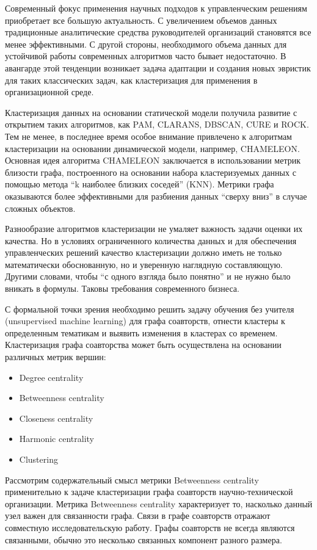 Современный фокус применения научных подходов к управленческим решениям приобретает все большую актуальность. С увеличением объемов данных традиционные аналитические средства руководителей организаций становятся все менее эффективными. С другой стороны, необходимого объема данных для устойчивой работы современных алгоритмов часто бывает недостаточно. В авангарде этой тенденции возникает задача адаптации и создания новых эвристик для таких классических задач, как кластеризация для применения в организационной среде.

Кластеризация данных на основании статической модели получила развитие с открытием таких алгоритмов, как PAM, CLARANS, DBSCAN, CURE и ROCK. Тем не менее, в последнее время особое внимание привлечено к алгоритмам кластеризации на основании динамической модели, например, CHAMELEON. Основная идея алгоритма CHAMELEON заключается в использовании метрик близости графа, построенного на основании набора кластеризуемых данных с помощью метода ``k наиболее близких соседей'' (KNN). Метрики графа оказываются более эффективными для разбиения данных ``сверху вниз'' в случае сложных объектов.

Разнообразие алгоритмов кластеризации не умаляет важность задачи оценки их качества. Но в условиях ограниченного количества данных и для обеспечения управленческих решений качество кластеризации должно иметь не только математически обоснованную, но и уверенную наглядную составляющую. Другими словами, чтобы ``с одного взгляда было понятно'' и не нужно было вникать в формулы. Таковы требования современного бизнеса.

С формальной точки зрения необходимо решить задачу обучения без учителя (unsupervised machine learning) для графа соавторств, отнести кластеры к определенным тематикам и выявить изменения в кластерах со временем.
Кластеризация графа соавторства может быть осуществлена на основании различных метрик вершин: 
\begin{itemize}
\tightlist
\item Degree centrality
\item Betweenness centrality
\item Closeness centrality
\item Harmonic centrality
\item Clustering
\end{itemize}

Рассмотрим содержательный смысл метрики Betweenness centrality применительно к задаче кластеризации графа соавторств научно-технической организации. Метрика Betweenness centrality характеризует то, насколько данный узел важен для связанности графа. Связи в графе соавторств отражают совместную исследовательскую работу. Графы соавторств не всегда являются связанными, обычно это несколько связанных компонент разного размера. 

